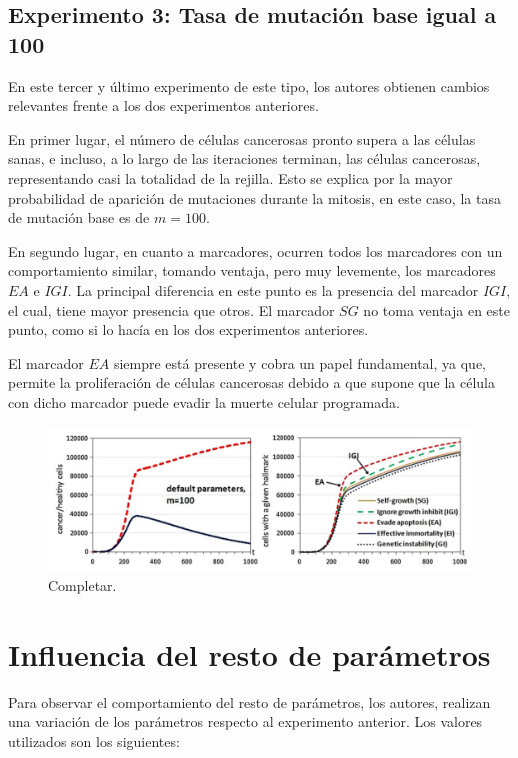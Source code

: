 \subsection{Experimento 3: Tasa de mutación base igual a 100}

En este tercer y último experimento de este tipo, los autores obtienen cambios relevantes frente a los dos
experimentos anteriores.

En primer lugar, el número de células cancerosas pronto supera a las células sanas, e incluso,
a lo largo de las iteraciones terminan, las células cancerosas, representando casi la totalidad de
la rejilla. Esto se explica por la mayor probabilidad de aparición de mutaciones durante la mitosis, en
este caso, la tasa de mutación base es de $m=100$.

En segundo lugar, en cuanto a marcadores, ocurren todos los marcadores con un comportamiento similar,
tomando ventaja, pero muy levemente, los marcadores $EA$ e $IGI$. La principal diferencia en este punto es
la presencia del marcador $IGI$, el cual, tiene mayor presencia que otros. El marcador $SG$ no toma ventaja en
este punto, como si lo hacía en los dos experimentos anteriores.

El marcador $EA$ siempre está presente y cobra un papel fundamental, ya que, permite la proliferación
de células cancerosas debido a que supone que la célula con dicho marcador puede evadir la muerte
celular programada.

\begin{figure}[h]
\centering
\includegraphics[scale=0.6]{figures/experiments/exp3}
\caption{Completar.}
\end{figure}

\section{Influencia del resto de parámetros}

Para observar el comportamiento del resto de parámetros, los autores, realizan una variación
de los parámetros respecto al experimento anterior. Los valores utilizados son los siguientes:

